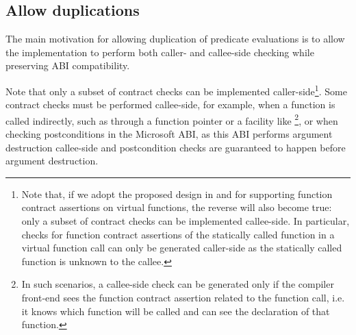 \subsection{Allow duplications}
\label{subsec:ville}

The main motivation for allowing duplication of predicate evaluations is to allow the implementation to perform both caller- and callee-side checking while preserving ABI compatibility.

Note that only a subset of contract checks can be implemented caller-side\footnote{Note that, if we adopt the proposed design in \cite{P3097R0} and \cite{P3165R0} for supporting function contract assertions on virtual functions, the reverse will also become true: only a subset of contract checks can be implemented callee-side. In particular, checks for function contract assertions of the statically called function in a virtual function call can only be generated caller-side as the statically called function is unknown to the callee.}. Some contract checks must be performed callee-side, for example, when a function is called indirectly, such as through a function pointer or a facility like \footnote{In such scenarios, a callee-side check can be generated only if the compiler front-end sees the function contract assertion related to the function call, i.e. it knows which function will be called and can see the declaration of that function.}, or when checking postconditions in the Microsoft ABI, as this ABI performs argument destruction callee-side and postcondition checks are guaranteed to happen before argument destruction. 

